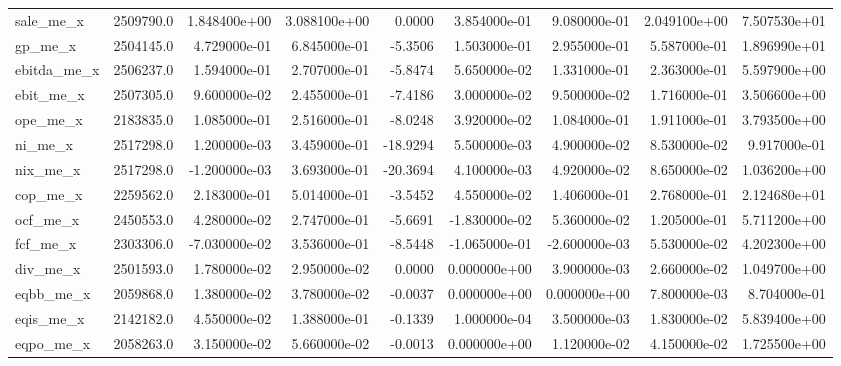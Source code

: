\documentclass[12pt]{article}
\begin{document}
\begin{landscape}
\begin{longtable}{|l|r|r|r|r|r|r|r|r|}
sale\_me\_x               &  2509790.0 &  1.848400e+00 &  3.088100e+00 &      0.0000 &  3.854000e-01 &  9.080000e-01 &  2.049100e+00 &  7.507530e+01 \\
gp\_me\_x                 &  2504145.0 &  4.729000e-01 &  6.845000e-01 &     -5.3506 &  1.503000e-01 &  2.955000e-01 &  5.587000e-01 &  1.896990e+01 \\
ebitda\_me\_x             &  2506237.0 &  1.594000e-01 &  2.707000e-01 &     -5.8474 &  5.650000e-02 &  1.331000e-01 &  2.363000e-01 &  5.597900e+00 \\
ebit\_me\_x               &  2507305.0 &  9.600000e-02 &  2.455000e-01 &     -7.4186 &  3.000000e-02 &  9.500000e-02 &  1.716000e-01 &  3.506600e+00 \\
ope\_me\_x                &  2183835.0 &  1.085000e-01 &  2.516000e-01 &     -8.0248 &  3.920000e-02 &  1.084000e-01 &  1.911000e-01 &  3.793500e+00 \\
ni\_me\_x                 &  2517298.0 &  1.200000e-03 &  3.459000e-01 &    -18.9294 &  5.500000e-03 &  4.900000e-02 &  8.530000e-02 &  9.917000e-01 \\
nix\_me\_x                &  2517298.0 & -1.200000e-03 &  3.693000e-01 &    -20.3694 &  4.100000e-03 &  4.920000e-02 &  8.650000e-02 &  1.036200e+00 \\
cop\_me\_x                &  2259562.0 &  2.183000e-01 &  5.014000e-01 &     -3.5452 &  4.550000e-02 &  1.406000e-01 &  2.768000e-01 &  2.124680e+01 \\
ocf\_me\_x                &  2450553.0 &  4.280000e-02 &  2.747000e-01 &     -5.6691 & -1.830000e-02 &  5.360000e-02 &  1.205000e-01 &  5.711200e+00 \\
fcf\_me\_x                &  2303306.0 & -7.030000e-02 &  3.536000e-01 &     -8.5448 & -1.065000e-01 & -2.600000e-03 &  5.530000e-02 &  4.202300e+00 \\
div\_me\_x                &  2501593.0 &  1.780000e-02 &  2.950000e-02 &      0.0000 &  0.000000e+00 &  3.900000e-03 &  2.660000e-02 &  1.049700e+00 \\
eqbb\_me\_x               &  2059868.0 &  1.380000e-02 &  3.780000e-02 &     -0.0037 &  0.000000e+00 &  0.000000e+00 &  7.800000e-03 &  8.704000e-01 \\
eqis\_me\_x               &  2142182.0 &  4.550000e-02 &  1.388000e-01 &     -0.1339 &  1.000000e-04 &  3.500000e-03 &  1.830000e-02 &  5.839400e+00 \\
eqpo\_me\_x               &  2058263.0 &  3.150000e-02 &  5.660000e-02 &     -0.0013 &  0.000000e+00 &  1.120000e-02 &  4.150000e-02 &  1.725500e+00 \\

\end{longtable}
\end{landscape}
\end{document}
